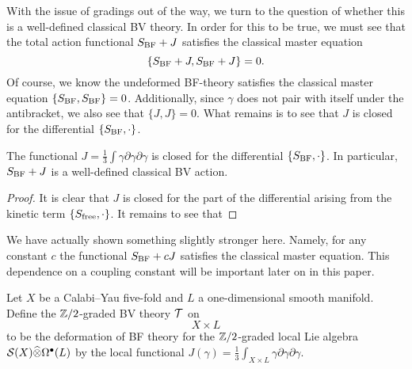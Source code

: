 \documentclass[11pt]{amsart}
\begin{document}
With the issue of gradings out of the way, we turn to the question of whether this is a well-defined classical BV theory.
In order for this to be true, we must see that the total action functional $S_{\rm BF} + J$ satisfies the classical master equation
\[
  \{S_{\rm BF} + J , S_{\rm BF} + J\} = 0 .
\]
Of course, we know the undeformed BF-theory satisfies the classical master equation $\{S_{\rm BF}, S_{\rm BF}\} = 0$.
Additionally, since $\gamma$ does not pair with itself under the antibracket, we also see that $\{J,J\}=0$.
What remains is to see that $J$ is closed for the differential $\{S_{\rm BF}, \cdot\}$.

\begin{lem}
The functional $J = \frac13 \int \gamma \partial \gamma \partial \gamma$ is closed for the differential $\{S_{\rm BF},\cdot\}$.
In particular, $S_{\rm BF} + J$ is a well-defined classical BV action.
\end{lem}

\begin{proof}
It is clear that $J$ is closed for the part of the differential arising from the kinetic term $\{S_{\rm free},\cdot\}$.
It remains to see that
\end{proof}

\begin{rmk}
  We have actually shown something slightly stronger here.
  Namely, for any constant $c$ the functional $S_{\rm BF} + c J$ satisfies the classical master equation.
  This dependence on a coupling constant will be important later on in this paper.
\end{rmk}

\begin{dfn}
Let $X$ be a Calabi--Yau five-fold and $L$ a one-dimensional smooth manifold.
Define the $\mathbb Z/2$-graded BV theory $\mathcal T$ on
\[
  X \times L
\]
to be the deformation of BF theory for the $\mathbb Z/2$-graded local Lie algebra $\mathcal S(X) \widehat{\otimes} \Omega^{\bullet}(L)$ by the local functional $J (\gamma) = \frac13 \int_{X \times L} \gamma \partial \gamma \partial \gamma.$
\end{dfn}

\end{document}
